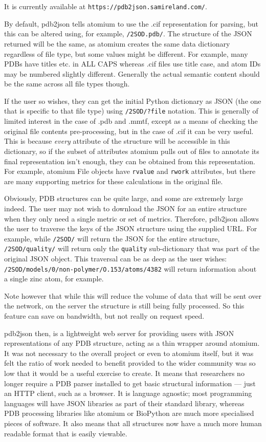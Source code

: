 It is currently available at \texttt{https://pdb2json.samireland.com/}.

By default, pdb2json tells atomium to use the .cif representation for parsing, but this can be altered using, for example, \texttt{/2SOD.pdb/}. The structure of the JSON returned will be the same, as atomium creates the same data dictionary regardless of file type, but some values might be different. For example, many PDBs have titles etc. in ALL CAPS whereas .cif files use title case, and atom IDs may be numbered slightly different. Generally the actual semantic content should be the same across all file types though.

If the user so wishes, they can get the initial Python dictionary as JSON (the one that is specific to that file type) using \texttt{/2SOD/?file} notation. This is generally of limited interest in the case of .pdb and .mmtf, except as a means of checking the original file contents pre-processing, but in the case of .cif it can be very useful. This is because \emph{every} attribute of the structure will be accessible in this dictionary, so if the subset of attributes atomium pulls out of files to annotate its final representation isn't enough, they can be obtained from this representation. For example, atomium File objects have \texttt{rvalue} and \texttt{rwork} attributes, but there are many supporting metrics for these calculations in the original file.

Obviously, PDB structures can be quite large, and some are extremely large indeed. The user may not wish to download the JSON for an entire structure when they only need a single metric or set of metrics. Therefore, pdb2json allows the user to traverse the keys of the JSON structure using the supplied URL. For example, while \texttt{/2SOD/} will return the JSON for the entire structure, \texttt{/2SOD/quality/} will return only the \texttt{quality} sub-dictionary that was part of the original JSON object. This traversal can be as deep as the user wishes: \texttt{/2SOD/models/0/non-polymer/O.153/atoms/4382} will return information about a single zinc atom, for example.

Note however that while this will reduce the volume of data that will be sent over the network, on the server the structure is still being fully processed. So this feature can save on bandwidth, but not really on request speed.

pdb2json then, is a lightweight web server for providing users with JSON representations of any PDB structure, acting as a thin wrapper around atomium. It was not necessary to the overall project or even to atomium itself, but it was felt the ratio of work needed to benefit provided to the wider community was so low that it would be a useful exercise to create. It means that researchers no longer require a PDB parser installed to get basic structural information --- just an HTTP client, such as a browser. It is language agnostic; most programming languages will have JSON libraries as part of their standard library, whereas PDB processing libraries like atomium or BioPython are much more specialised pieces of software. It also means that all structures now have a much more human readable format that is easily viewable.

